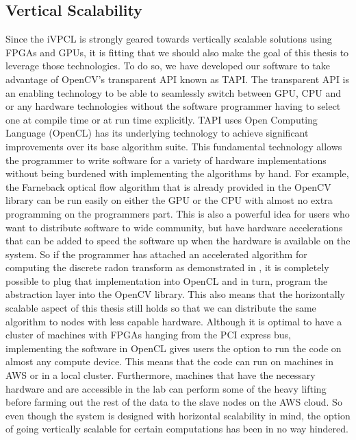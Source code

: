\subsection{\label{subsection:opencv_tapi}Vertical Scalability}
Since the iVPCL is strongly geared towards vertically scalable solutions using
FPGAs and GPUs, it is fitting that we should also make the goal of this thesis
to leverage those technologies. To do so, we have developed our software to take
advantage of OpenCV's transparent API known as TAPI. The transparent API is an
enabling technology to be able to seamlessly switch between GPU, CPU and or any
hardware technologies without the software programmer having to select one at
compile time or at run time explicitly. TAPI uses Open Computing Language
(OpenCL) has its underlying technology to achieve significant improvements over
its base algorithm suite. This fundamental technology allows the programmer to
write software for a variety of hardware implementations without being burdened
with implementing the algorithms by hand. For example, the Farneback optical
flow algorithm that is already provided in the OpenCV library can be run easily
on either the GPU or the CPU with almost no extra programming on the programmers
part. This is also a powerful idea for users who want to distribute software to
wide community, but have hardware accelerations that can be added to speed the
software up when the hardware is available on the system. So if the programmer
has attached an accelerated algorithm for computing the discrete radon transform
as demonstrated in \cite{Cesar2014a}, it is completely possible to plug that
implementation into OpenCL and in turn, program the abstraction layer into the
OpenCV library. This also means that the horizontally scalable aspect of this
thesis still holds so that we can distribute the same algorithm to nodes with
less capable hardware. Although it is optimal to have a cluster of machines with
FPGAs hanging from the PCI express bus, implementing the software in OpenCL
gives users the option to run the code on almost any compute device. This means
that the code can run on machines in AWS or in a local cluster. Furthermore,
machines that have the necessary hardware and are accessible in the lab can
perform some of the heavy lifting before farming out the rest of the data to the
slave nodes on the AWS cloud. So even though the system is designed with
horizontal scalability in mind, the option of going vertically scalable for
certain computations has been in no way hindered.

